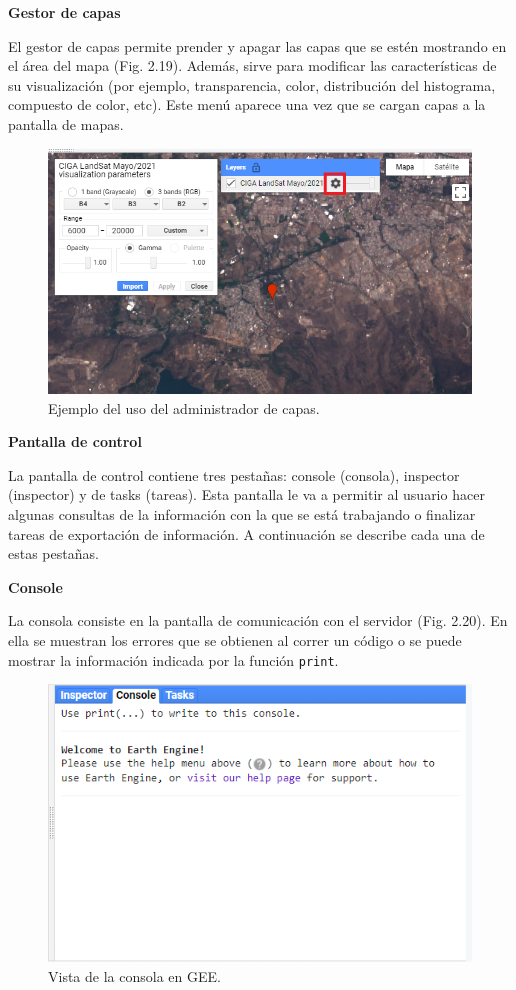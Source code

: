 \documentclass[
  12pt,
  letterpaper,
  twoside]{book}
\begin{document}
\textbf{Gestor de capas}

El gestor de capas permite prender y apagar las capas que se estén mostrando en el área del mapa (Fig. 2.19). Además, sirve para modificar las características de su visualización (por ejemplo, transparencia, color, distribución del histograma, compuesto de color, etc). Este menú aparece una vez que se cargan capas a la pantalla de mapas.

\begin{figure}[btp]

{\centering \includegraphics[width=0.8\linewidth]{Img/layer} 

}

\caption{Ejemplo del uso del administrador de capas.}\label{fig:unnamed-chunk-20}
\end{figure}

\textbf{Pantalla de control}

La pantalla de control contiene tres pestañas: console (consola), inspector (inspector) y de tasks (tareas). Esta pantalla le va a permitir al usuario hacer algunas consultas de la información con la que se está trabajando o finalizar tareas de exportación de información. A continuación se describe cada una de estas pestañas.

\textbf{Console}

La consola consiste en la pantalla de comunicación con el servidor (Fig. 2.20). En ella se muestran los errores que se obtienen al correr un código o se puede mostrar la información indicada por la función \texttt{print}.

\begin{figure}[btp]

{\centering \includegraphics[width=0.8\linewidth]{Img/rigthPanel} 

}

\caption{Vista de la consola en GEE.}\label{fig:unnamed-chunk-21}
\end{figure}
\end{document}

